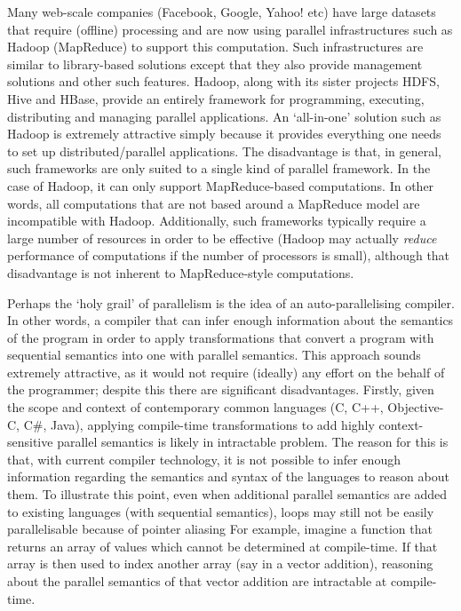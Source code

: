 Many web-scale companies (Facebook, Google, Yahoo! etc) have large datasets that require (offline) processing and are now using parallel infrastructures such as Hadoop (MapReduce) to support this computation. Such infrastructures are similar to library-based solutions except that they also provide management solutions and other such features. Hadoop, along with its sister projects HDFS, Hive and HBase, provide an entirely framework for programming, executing, distributing and managing parallel applications. An `all-in-one' solution such as Hadoop is extremely attractive simply because it provides everything one needs to set up distributed/parallel applications. The disadvantage is that, in general, such frameworks are only suited to a single kind of parallel framework. In the case of Hadoop, it can only support MapReduce-based computations. In other words, all computations that are not based around a MapReduce model are incompatible with Hadoop. Additionally, such frameworks typically require a large number of resources in order to be effective (Hadoop may actually \emph{reduce} performance of computations if the number of processors is small), although that disadvantage is not inherent to MapReduce-style computations.

Perhaps the `holy grail' of parallelism is the idea of an auto-parallelising compiler. In other words, a compiler that can infer enough information about the semantics of the program in order to apply transformations that convert a program with sequential semantics into one with parallel semantics. This approach sounds extremely attractive, as it would not require (ideally) any effort on the behalf of the programmer; despite this there are significant disadvantages. Firstly, given the scope and context of contemporary common languages (C, C++, Objective-C, C\#, Java), applying compile-time transformations to add highly context-sensitive parallel semantics is likely in intractable problem. The reason for this is that, with current compiler technology, it is not possible to infer enough information regarding the semantics and syntax of the languages to reason about them. To illustrate this point, even when additional parallel semantics are added to existing languages (with sequential semantics), loops may still not be easily parallelisable because of pointer aliasing For example, imagine a function that returns an array of values which cannot be determined at compile-time. If that array is then used to index another array (say in a vector addition), reasoning about the parallel semantics of that vector addition are intractable at compile-time.

